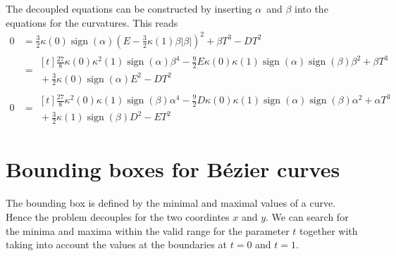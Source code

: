 \documentclass{article}
\newcommand{\sign}{\operatorname{sign}}
\begin{document}
The decoupled equations can be constructed by inserting $\alpha$~and $\beta$
into the equations for the curvatures. This reads
\begin{align}
  0 &= \frac{3}{2}\kappa(0)\sign(\alpha)
       \left(E - \frac{3}{2}\kappa(1)\beta |\beta |\right)^2
     + \beta T^3 - D T^2 \\
    &= \begin{aligned}[t]
         \frac{27}{8} \kappa(0) \kappa^2(1) \sign(\alpha) \beta^4
       - \frac{9}{2} E \kappa(0) \kappa(1) \sign(\alpha)\sign(\beta) \beta^2
       + \beta T^3 \\
     {}+ \frac{3}{2} \kappa(0) \sign(\alpha) E^2 - D T^2
       \end{aligned}\\
  0 &= \begin{aligned}[t]
         \frac{27}{8} \kappa^2(0) \kappa(1) \sign(\beta) \alpha^4
       - \frac{9}{2} D \kappa(0) \kappa(1) \sign(\alpha)\sign(\beta) \alpha^2
       + \alpha T^3 \\
     {}+ \frac{3}{2} \kappa(1) \sign(\beta) D^2 - E T^2
       \end{aligned}
\end{align}
%

\section{Bounding boxes for B\'ezier curves}

The bounding box is defined by the minimal and maximal values of a
curve. Hence the problem decouples for the two coordintes $x$ and $y$.
We can search for the minima and maxima within the valid range for the
parameter $t$ together with taking into account the values at the
boundaries at $t=0$ and $t=1$.
\end{document}
